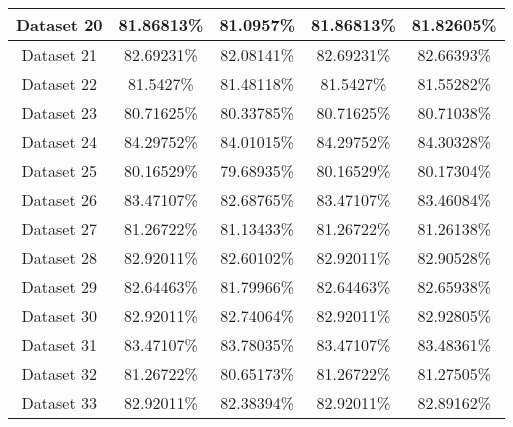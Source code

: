 \begin{table}
\begin{tabular}{ |c||c|c|c|c| }
    \hline
    Dataset 20&81.86813\%&81.0957\%&81.86813\%&81.82605\%\\
    \hline
    Dataset 21&82.69231\%&82.08141\%&82.69231\%&82.66393\%\\
    \hline
    Dataset 22&81.5427\%&81.48118\%&81.5427\%&81.55282\%\\
    \hline
    Dataset 23&80.71625\%&80.33785\%&80.71625\%&80.71038\%\\
    \hline
    Dataset 24&84.29752\%&84.01015\%&84.29752\%&84.30328\%\\
    \hline
    Dataset 25&80.16529\%&79.68935\%&80.16529\%&80.17304\%\\
    \hline
    Dataset 26&83.47107\%&82.68765\%&83.47107\%&83.46084\%\\
    \hline
    Dataset 27&81.26722\%&81.13433\%&81.26722\%&81.26138\%\\
    \hline
    Dataset 28&82.92011\%&82.60102\%&82.92011\%&82.90528\%\\
    \hline
    Dataset 29&82.64463\%&81.79966\%&82.64463\%&82.65938\%\\
    \hline
    Dataset 30&82.92011\%&82.74064\%&82.92011\%&82.92805\%\\
    \hline
    Dataset 31&83.47107\%&83.78035\%&83.47107\%&83.48361\%\\
    \hline
    Dataset 32&81.26722\%&80.65173\%&81.26722\%&81.27505\%\\
    \hline
    Dataset 33&82.92011\%&82.38394\%&82.92011\%&82.89162\%\\
    \hline
\end{tabular}
\end{table}

\newpage

